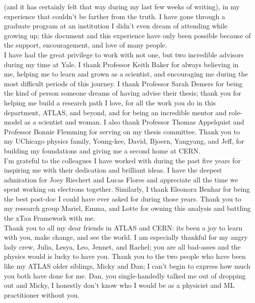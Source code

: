 
 (and it has certainly felt that way during my last few weeks of writing), in my experience that couldn't be farther from the truth. I have gone through a graduate program at an institution I didn't even dream of attending while growing up; this document and this experience have only been possible because of the support, encouragement, and love of many people.\\

I have had the great privilege to work with not one, but two incredible advisors during my time at Yale. I thank Professor Keith Baker for always believing in me, helping me to learn and grown as a scientist, and encouraging me during the most difficult periods of this journey. I thank Professor Sarah Demers for being the kind of person someone dreams of having advise their thesis; thank you for helping me build a research path I love, for all the work you do in this department, ATLAS, and beyond, and for being an incredible mentor and role-model as a scientist and woman. I also thank Professor Thomas Appelquist and Professor Bonnie Flemming for serving on my thesis committee. Thank you to my UChicago physics family, Young-kee, David, Bjoern, Yangyang, and Jeff, for building my foundations and giving me a second home at CERN.\\

I'm grateful to the colleagues I have worked with during the past five years for inspiring me with their dedication and brilliant ideas. I have the deepest admiration for Joey Riechert and Lucas Flores and appreciate all the time we spent working on electrons together. Similarly, I thank Eleonora Benhar for being the best post-doc I could have ever asked for during those years. Thank you to my research group Mariel, Emma, and Lotte for owning this analysis and battling the xTau Framework with me.\\

Thank you to all my dear friends in ATLAS and CERN: its been a joy to learn with you, make change, and see the world. I am especially thankful for my angry lady crew, Julia, Lesya, Leo, Jennet, and Rachel; you are all bad-asses and the physics would is lucky to have you. Thank you to the two people who have been like my ATLAS older siblings, Micky and Dan; I can't begin to express how much you both have done for me. Dan, you single-handedly talked me out of dropping out and Micky, I honestly don't know who I would be as a physicist and ML practitioner without you.

